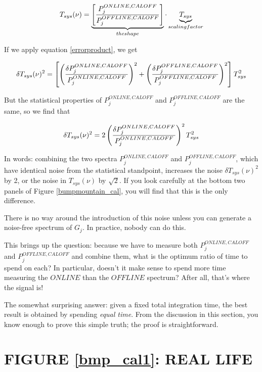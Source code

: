 \documentclass[preprint]{aastex}
\begin{document}
\begin{equation} 
T_{sys}(\nu) = 
\underbrace{\left[ {P_j^{ONLINE, CALOFF} \over P_j^{OFFLINE, CALOFF}} 
\right]}_{the shape} \cdot
\underbrace{ T_{sys}}_{scaling factor}   
\end{equation}

\noindent If we apply equation \ref{errorproduct}, we get

\begin{equation}
\delta T_{sys}(\nu)^2 = 
\left[ \left( {\delta P_j^{ONLINE, CALOFF} \over P_j^{ONLINE,
CALOFF}} \right)^2 +  \left( {\delta P_j^{OFFLINE, CALOFF} \over P_j^{OFFLINE,
CALOFF}} \right)^2 \right] T_{sys}^2
\end{equation}

\noindent But the statistical properties of $P_j^{ONLINE, CALOFF}$ and
$P_j^{OFFLINE, CALOFF}$ are the same, so we find that

\begin{equation}
\delta T_{sys}(\nu)^2 = 2 
 \left( {\delta P_j^{ONLINE, CALOFF} \over P_j^{ONLINE,
CALOFF}} \right)^2 T_{sys}^2
\end{equation}

	In words: combining the two spectra $P_j^{ONLINE, CALOFF}$ and
$P_j^{OFFLINE, CALOFF}$, which have identical noise from the statistical
standpoint, increases the noise $\delta T_{sys}(\nu)^2$ by 2, or the
noise in $T_{sys}(\nu)$ by $\sqrt 2$. If you look carefully at the
bottom two panels of Figure \ref{bumpmountain_cal}, you will find that
this is the only difference. 

	There is no way around the introduction of this noise unless you
can generate a noise-free spectrum of $G_j$. In practice, nobody can do
this. 

	This brings up the question: because we have to measure both
$P_j^{ONLINE, CALOFF}$ and $P_j^{OFFLINE, CALOFF}$ and combine them, what
is the optimum ratio of time to spend on each? In particular, doesn't it
make sense to spend more time measuring the $ONLINE$ than the $OFFLINE$
spectrum? After all, that's where the signal is! 

	The somewhat surprising answer: given a fixed total integration
time, the best result is obtained by spending {\it equal time}. From the
discussion in this section, you know enough to prove this simple truth;
the proof is straightforward.

\section{FIGURE \ref{bmp_cal1}: REAL LIFE} \label{figure3}
\end{document}
